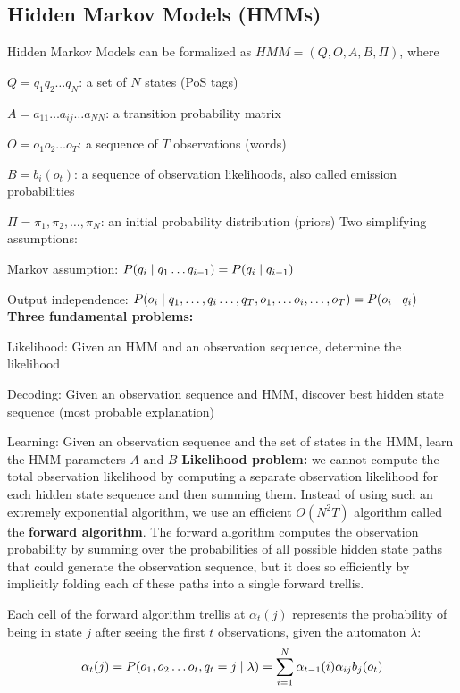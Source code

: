 \documentclass[12pt]{article}
\begin{document}
\subsection{Hidden Markov Models (HMMs)}
Hidden Markov Models can be formalized as $HMM = (Q,O,A,B,\Pi)$, where
\ulb
\item $Q = q_1q_2\dots q_N$: a set of $N$ states (PoS tags)
\item $A = a_{11} \dots a_{ij} \dots a_{NN}$: a transition probability matrix
\item $O = o_1o_2\dots o_T$: a sequence of $T$ observations (words)
\item $B = b_i(o_t)$: a sequence of observation likelihoods, also called emission probabilities
\item $\Pi = \pi_1,\pi_2,\dots ,\pi_N$: an initial probability distribution (priors)
\ule
Two simplifying assumptions:
\ulb
\item Markov assumption: $P(q_i \mid q_1 \dots q_{i-1}) = P(q_i \mid q_{i-1})$
\item Output independence: $P(o_i \mid q_1,\dots ,q_i \dots , q_T, o_1, \dots o_i, \dots ,o_T) = P(o_i \mid q_i)$
\ule
\textbf{Three fundamental problems:}
\olb
\item Likelihood: Given an HMM and an observation sequence, determine the likelihood
\item Decoding: Given an observation sequence and HMM, discover best hidden state sequence (most probable explanation)
\item Learning: Given an observation sequence and the set of states in the HMM, learn the HMM parameters $A$ and $B$
\ole
\textbf{Likelihood problem:} we cannot compute the total observation likelihood by computing a separate observation likelihood for each hidden state sequence and then summing them. Instead of using such an extremely exponential algorithm, we use an efficient $O(N^2T)$ algorithm called the \textbf{forward algorithm}. The forward algorithm computes the observation probability by summing over the probabilities of all possible hidden state paths that could generate the observation sequence, but it does so efficiently by implicitly folding each of these paths into a single forward trellis.
\par Each cell of the forward algorithm trellis at $\alpha_t(j)$ represents the probability of being in state $j$ after seeing the first $t$ observations, given the automaton $\lambda$:
\[ \alpha_t(j) = P(o_1,o_2\dots o_t,q_t = j \mid \lambda) = \sum_{i=1}^N \alpha_{t-1}(i)\alpha_{ij}b_j(o_t) \]
\end{document}
